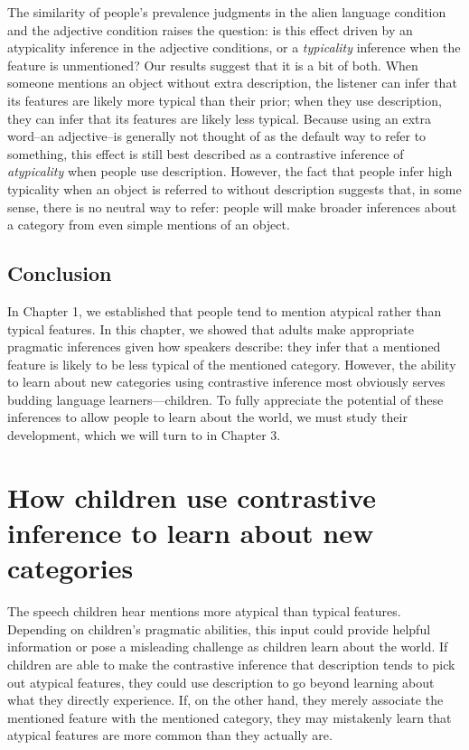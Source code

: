\documentclass{ucetd}
\begin{document}
The similarity of people's prevalence judgments in the alien language
condition and the adjective condition raises the question: is this
effect driven by an atypicality inference in the adjective conditions,
or a \emph{typicality} inference when the feature is unmentioned? Our
results suggest that it is a bit of both. When someone mentions an
object without extra description, the listener can infer that its
features are likely more typical than their prior; when they use
description, they can infer that its features are likely less typical.
Because using an extra word--an adjective--is generally not thought of
as the default way to refer to something, this effect is still best
described as a contrastive inference of \emph{atypicality} when people
use description. However, the fact that people infer high typicality
when an object is referred to without description suggests that, in some
sense, there is no neutral way to refer: people will make broader
inferences about a category from even simple mentions of an object.

\hypertarget{conclusion}{%
\section{Conclusion}\label{conclusion}}

In Chapter 1, we established that people tend to mention atypical rather
than typical features. In this chapter, we showed that adults make
appropriate pragmatic inferences given how speakers describe: they infer
that a mentioned feature is likely to be less typical of the mentioned
category. However, the ability to learn about new categories using
contrastive inference most obviously serves budding language
learners---children. To fully appreciate the potential of these
inferences to allow people to learn about the world, we must study their
development, which we will turn to in Chapter 3.

\hypertarget{how-children-use-contrastive-inference-to-learn-about-new-categories}{%
\chapter{How children use contrastive inference to learn about new
categories}\label{how-children-use-contrastive-inference-to-learn-about-new-categories}}

The speech children hear mentions more atypical than typical features.
Depending on children's pragmatic abilities, this input could provide
helpful information or pose a misleading challenge as children learn
about the world. If children are able to make the contrastive inference
that description tends to pick out atypical features, they could use
description to go beyond learning about what they directly experience.
If, on the other hand, they merely associate the mentioned feature with
the mentioned category, they may mistakenly learn that atypical features
are more common than they actually are.
\end{document}
